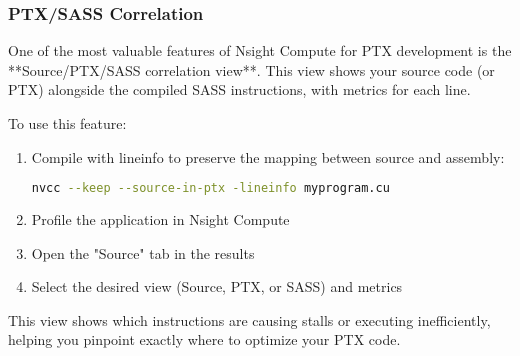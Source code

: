 \subsubsection{PTX/SASS Correlation}

One of the most valuable features of Nsight Compute for PTX development is the **Source/PTX/SASS correlation view**. This view shows your source code (or PTX) alongside the compiled SASS instructions, with metrics for each line.

To use this feature:
\begin{enumerate}
    \item Compile with lineinfo to preserve the mapping between source and assembly:
    \begin{lstlisting}[language=bash]
    nvcc --keep --source-in-ptx -lineinfo myprogram.cu
    \end{lstlisting}
    
    \item Profile the application in Nsight Compute
    
    \item Open the "Source" tab in the results
    
    \item Select the desired view (Source, PTX, or SASS) and metrics
\end{enumerate}

This view shows which instructions are causing stalls or executing inefficiently, helping you pinpoint exactly where to optimize your PTX code.

